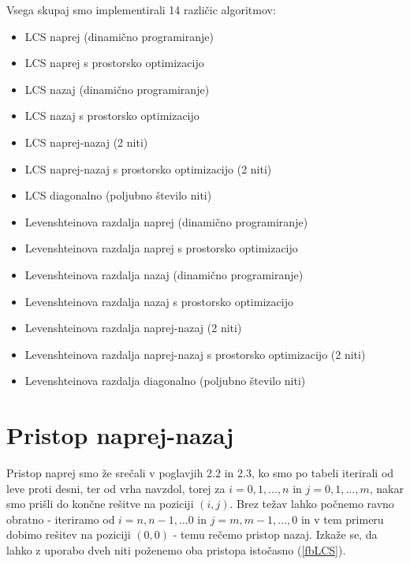 \documentclass[a4paper,12pt,openright]{book}
\begin{document}
Vsega skupaj smo implementirali 14 različic algoritmov:
\begin{itemize}
  \item LCS naprej (dinamično programiranje)
  \item LCS naprej s prostorsko optimizacijo
  \item LCS nazaj (dinamično programiranje)
  \item LCS nazaj s prostorsko optimizacijo
  \item LCS naprej-nazaj (2 niti)
  \item LCS naprej-nazaj s prostorsko optimizacijo (2 niti)
  \item LCS diagonalno (poljubno število niti)
  \item Levenshteinova razdalja naprej (dinamično programiranje)
  \item Levenshteinova razdalja naprej s prostorsko optimizacijo
  \item Levenshteinova razdalja nazaj (dinamično programiranje)
  \item Levenshteinova razdalja nazaj s prostorsko optimizacijo
  \item Levenshteinova razdalja naprej-nazaj (2 niti)
  \item Levenshteinova razdalja naprej-nazaj s prostorsko optimizacijo (2 niti)
  \item Levenshteinova razdalja diagonalno (poljubno število niti)
\end{itemize}

\section{Pristop naprej-nazaj}

Pristop naprej smo že srečali v poglavjih 2.2 in 2.3, ko smo po tabeli iterirali od leve proti desni, ter od vrha navzdol, torej za \begin{math}i = 0, 1, ..., n\end{math} in \begin{math}j = 0, 1, ..., m\end{math}, nakar smo prišli do končne rešitve na poziciji \begin{math}(i, j)\end{math}. Brez težav lahko počnemo ravno obratno - iteriramo od \begin{math}i = n, n-1, ... 0\end{math} in \begin{math}j = m, m-1, ..., 0\end{math} in v tem primeru dobimo rešitev na poziciji \begin{math}(0, 0)\end{math} - temu rečemo pristop nazaj. Izkaže se, da lahko z uporabo dveh niti poženemo oba pristopa istočasno (\ref{fbLCS}). 
\end{document}
